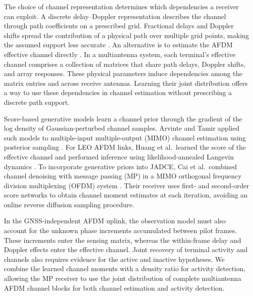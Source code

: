 The choice of channel representation determines which dependencies a
receiver can exploit. A discrete delay--Doppler representation describes
the channel through path coefficients on a prescribed grid. Fractional
delays and Doppler shifts spread the contribution of a physical path
over multiple grid points, making the assumed support less accurate
\cite{shen2025,huang2026}. An alternative is to estimate the AFDM
effective channel directly \cite{huang2026}. In a multiantenna system,
each terminal's effective channel comprises a collection of matrices
that share path delays, Doppler shifts, and array responses. These
physical parameters induce dependencies among the matrix entries and
across receive antennas. Learning their joint distribution offers a way
to use these dependencies in channel estimation without prescribing a
discrete path support.

Score-based generative models learn a channel prior through the gradient
of the log density of Gaussian-perturbed channel samples. Arvinte and
Tamir applied such models to multiple-input multiple-output (MIMO)
channel estimation using posterior sampling \cite{arvinte2023}.
For LEO AFDM links, Huang et al.\ learned the score of the effective
channel and performed inference using likelihood-annealed Langevin
dynamics \cite{huang2026}. To incorporate generative priors into JADCE,
Cai et al.\ combined channel denoising with message passing (MP) in a
MIMO orthogonal frequency division multiplexing (OFDM) system
\cite{cai2026}. Their receiver uses first- and second-order score
networks to obtain channel moment estimates at each iteration, avoiding
an online reverse diffusion sampling procedure.

In the GNSS-independent AFDM uplink, the observation model must also
account for the unknown phase increments accumulated between pilot
frames. These increments enter the sensing matrix, whereas the
within-frame delay and Doppler effects enter the effective channel.
Joint recovery of terminal activity and channels also requires evidence
for the active and inactive hypotheses. We combine the learned
channel moments with a density ratio for activity detection, allowing
the MP receiver to use the joint distribution of complete multiantenna
AFDM channel blocks for both channel estimation and activity detection.


